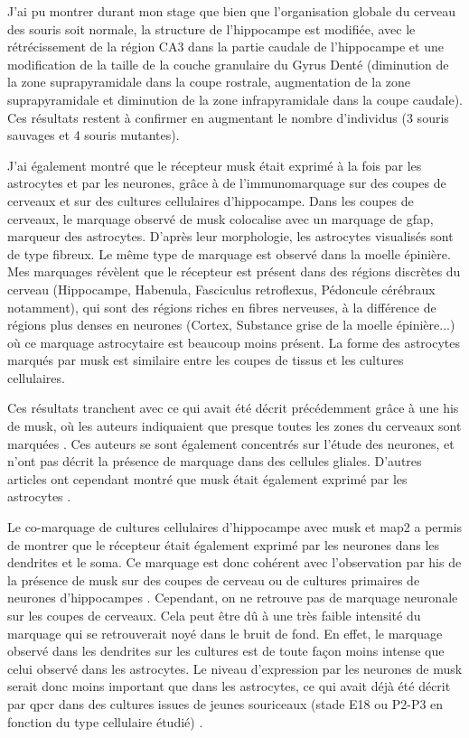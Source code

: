 J'ai pu montrer durant mon stage que bien que l'organisation globale du cerveau des souris \mcrd soit normale, la structure de l'hippocampe est modifiée, avec le rétrécissement de la région CA3 dans la partie caudale de l'hippocampe et une modification de la taille de la couche granulaire du Gyrus Denté (diminution de la zone suprapyramidale dans la coupe rostrale, augmentation de la zone suprapyramidale et diminution de la zone infrapyramidale dans la coupe caudale). Ces résultats restent à confirmer en augmentant le nombre d'individus (3 souris sauvages et 4 souris mutantes).

J'ai également montré que le récepteur \gls{musk} était exprimé à la fois par les astrocytes et par les neurones, grâce à de l'immunomarquage sur des coupes de cerveaux et sur des cultures cellulaires d'hippocampe. Dans les coupes de cerveaux, le marquage observé de \gls{musk} colocalise avec un marquage de \gls{gfap}, marqueur des astrocytes. D'après leur morphologie, les astrocytes visualisés sont de type fibreux. Le même type de marquage est observé dans la moelle épinière. Mes marquages révèlent que le récepteur est présent dans des régions discrètes du cerveau (Hippocampe, Habenula, Fasciculus retroflexus, Pédoncule cérébraux notamment), qui sont des régions riches en fibres nerveuses, à la différence de régions plus denses en neurones (Cortex, Substance grise de la moelle épinière...) où ce marquage astrocytaire est beaucoup moins présent. La forme des astrocytes marqués par \gls{musk} est similaire entre les coupes de tissus et les cultures cellulaires.

Ces résultats tranchent avec ce qui avait été décrit précédemment grâce à une \acrlong{his} de \gls{musk}, où les auteurs indiquaient que presque toutes les zones du cerveaux sont marquées \cite{Garcia-Osta2006}. Ces auteurs se sont également concentrés sur l'étude des neurones, et n'ont pas décrit la présence de marquage dans des cellules gliales. D'autres articles ont cependant montré que \gls{musk} était également exprimé par les astrocytes \cite{Sun2016}.

Le co-marquage de cultures cellulaires d'hippocampe avec \gls{musk} et \gls{map2} a permis de montrer que le récepteur était également exprimé par les neurones dans les dendrites et le soma. Ce marquage est donc cohérent avec l'observation par \acrlong{his} de la présence de \gls{musk} sur des coupes de cerveau ou de cultures primaires de neurones d'hippocampes \cite{Garcia-Osta2006}. Cependant, on ne retrouve pas de marquage neuronale sur les coupes de cerveaux. Cela peut être dû à une très faible intensité du marquage qui se retrouverait noyé dans le bruit de fond. En effet, le marquage observé dans les dendrites sur les cultures est de toute façon moins intense que celui observé dans les astrocytes. Le niveau d'expression par les neurones de \gls{musk} serait donc moins important que dans les astrocytes, ce qui avait déjà été décrit par \gls{qpcr} dans des cultures issues de jeunes souriceaux (stade E18 ou P2-P3 en fonction du type cellulaire étudié) \cite{Sun2016}. 

